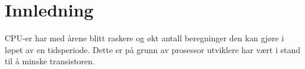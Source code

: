 \begin{titlepage}
	
	
	
	
	 
	
	\vfill %
	
\end{titlepage}
\newpage
\tableofcontents
\newpage

\section{Innledning}
CPU-er har med årene blitt raskere og økt antall beregninger den kan gjøre i løpet av en tidsperiode. Dette er på grunn av prosessor utviklere har vært i stand til å minske transistoren.

\newpage
